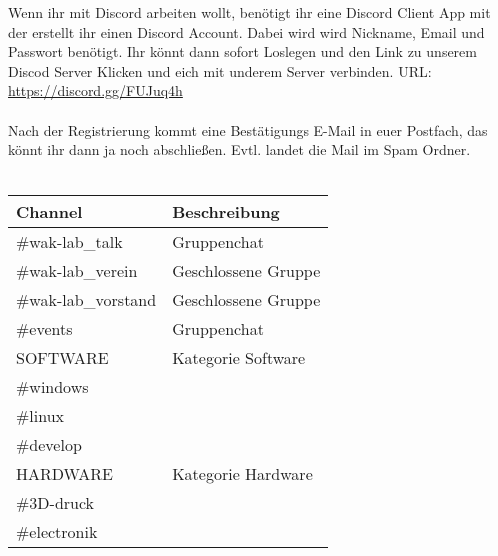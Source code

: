 Wenn ihr mit Discord arbeiten wollt, benötigt ihr eine Discord Client App mit der erstellt ihr einen Discord Account. Dabei wird wird Nickname, Email und Passwort benötigt. Ihr könnt dann sofort Loslegen und den Link zu unserem Discod Server Klicken und eich mit underem Server verbinden. URL: \url{https://discord.gg/FUJuq4h}\\
\ \\
Nach der Registrierung kommt eine Bestätigungs E-Mail in euer Postfach, das könnt ihr dann ja noch abschließen. Evtl. landet die Mail im Spam Ordner.   \\

\ \\
\begin{raggedright}
\begin{tabular}{|p{}|p{}|}
\hline
\textbf{Channel} & \textbf{Beschreibung}\\
\hline
\#wak-lab\_talk & Gruppenchat\\
\hline
\#wak-lab\_verein & Geschlossene Gruppe\\
\hline
\#wak-lab\_vorstand & Geschlossene Gruppe\\
\hline
\#events & Gruppenchat\\
\hline
SOFTWARE & Kategorie Software\\
\cline{1-1}
\#windows & \\
\cline{1-1}
\#linux & \\
\cline{1-1}
\#develop & \\
\hline
HARDWARE & Kategorie Hardware\\
\cline{1-1}
\#3D-druck & \\
\cline{1-1}
\#electronik & \\
\hline
\end{tabular}
\label{tab:Channels}
\end{raggedright}


